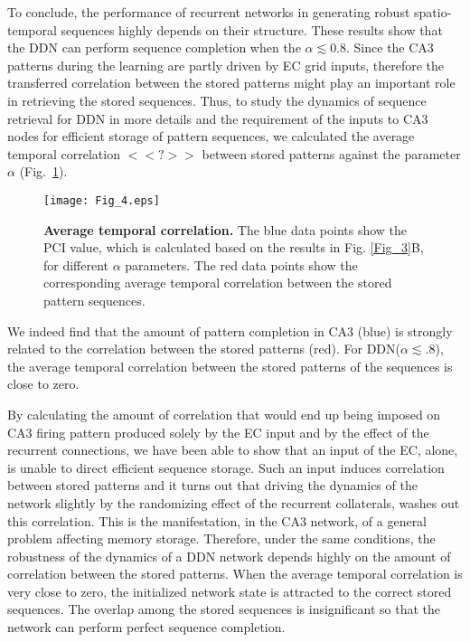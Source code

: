 \documentclass[utf8]{frontiersSCNS} %
\begin{document}
%
To conclude, the performance of recurrent networks in generating robust spatio-temporal sequences highly depends on their structure. These results show that the DDN can perform sequence completion when the $\alpha \lesssim 0.8$. Since the CA3 patterns during the learning are partly driven by EC grid inputs, therefore the transferred correlation between the stored patterns might play an important role in retrieving the stored sequences. 
Thus, to study the dynamics of sequence retrieval for DDN in more details and the requirement of the inputs to CA3 nodes for efficient storage of pattern sequences, we calculated the average temporal correlation $ <<?>>$ between stored patterns against the parameter $\alpha$ (Fig.~\ref{Fig_4}).   

\begin{figure}[!htb]
\centering\texttt{[image: Fig\_4.eps]}
\caption{\textbf{Average temporal correlation.} 
The blue data points show the PCI value, which is calculated based on the results in Fig. \ref{Fig_3}B, for different $\alpha$ parameters. The red data points show the corresponding average temporal correlation between the stored pattern sequences.
}
\label{Fig_4}
\end{figure}
We indeed find that the amount of pattern completion in CA3 (blue) is strongly related to the correlation between the stored patterns (red). 
For DDN($\alpha \lesssim .8$), the average temporal correlation between the stored patterns of the sequences is close to zero. 

By calculating the amount of correlation that would end up being imposed on CA3 firing pattern produced solely by the EC input and by the effect of the recurrent connections, we have been able to show that an input of the EC, alone, is unable to direct efficient sequence storage. Such an input induces correlation between stored patterns and it turns out that driving the dynamics of the network slightly by the randomizing effect of the recurrent collaterals, washes out this correlation. This is the manifestation, in the CA3 network, of a general problem affecting memory storage. 
Therefore, under the same conditions, the robustness of the dynamics of a DDN network depends highly on the amount of correlation between the stored patterns. When the average temporal correlation is very close to zero, the initialized network state is attracted to the correct stored sequences. The overlap among the stored sequences is insignificant so that the network can perform perfect sequence completion.
\end{document}
